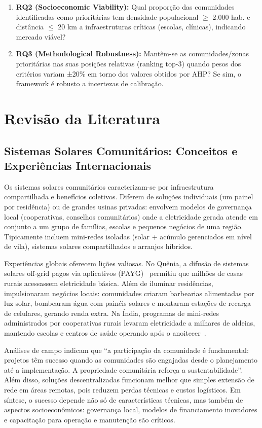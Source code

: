 \documentclass[12pt, a4paper]{article}
\begin{document}
\begin{itemize}
\begin{enumerate}
\item \textbf{RQ2 (Socioeconomic Viability):} Qual proporção das comunidades identificadas como prioritárias tem densidade populacional $\geq$ 2.000 hab. e distância $\leq$ 20 km a infraestruturas críticas (escolas, clínicas), indicando mercado viável?

\item \textbf{RQ3 (Methodological Robustness):} Mantêm-se as comunidades/zonas prioritárias nas suas posições relativas (ranking top-3) quando pesos dos critérios variam ±20\% em torno dos valores obtidos por AHP? Se sim, o framework é robusto a incertezas de calibração.
\end{enumerate}

\section{Revisão da Literatura}

\subsection{Sistemas Solares Comunitários: Conceitos e Experiências Internacionais}

Os sistemas solares comunitários caracterizam-se por infraestrutura compartilhada e benefícios coletivos. Diferem de soluções individuais (um painel por residência) ou de grandes usinas privadas: envolvem modelos de governança local (cooperativas, conselhos comunitários) onde a eletricidade gerada atende em conjunto a um grupo de famílias, escolas e pequenos negócios de uma região. Tipicamente incluem mini-redes isoladas (solar + acúmulo gerenciados em nível de vila), sistemas solares compartilhados e arranjos híbridos.

Experiências globais oferecem lições valiosas. No Quênia, a difusão de sistemas solares off-grid pagos via aplicativos (PAYG)~\citep{Onyango2022} permitiu que milhões de casas rurais acessassem eletricidade básica. Além de iluminar residências, impulsionaram negócios locais: comunidades criaram barbearias alimentadas por luz solar, bombearam água com painéis solares e montaram estações de recarga de celulares, gerando renda extra. Na Índia, programas de mini-redes administrados por cooperativas rurais levaram eletricidade a milhares de aldeias, mantendo escolas e centros de saúde operando após o anoitecer~\citep{Mapako2021}.

Análises de campo indicam que ``a participação da comunidade é fundamental: projetos têm sucesso quando as comunidades são engajadas desde o planejamento até a implementação. A propriedade comunitária reforça a sustentabilidade''. Além disso, soluções descentralizadas funcionam melhor que simples extensão de rede em áreas remotas, pois reduzem perdas técnicas e custos logísticos. Em síntese, o sucesso depende não só de características técnicas, mas também de aspectos socioeconômicos: governança local, modelos de financiamento inovadores e capacitação para operação e manutenção são críticos.


\end{itemize}
\end{document}
